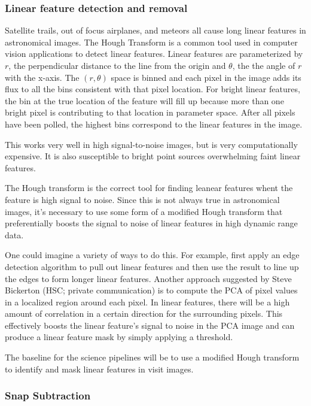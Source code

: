 \subsubsection{Linear feature detection and removal}
\label{sec:acLinearFeatureDetection}


Satellite trails, out of focus airplanes, and meteors all cause long linear features in astronomical images.  The Hough Transform \citep{c1962method} is a common tool used in computer vision applications to detect linear features.  Linear features are parameterized by $r$, the perpendicular distance to the line from the origin and $\theta$, the the angle of $r$ with the x-axis.  The $(r, \theta)$ space is binned and each pixel in the image adds its flux to all the bins consistent with that pixel location.  For bright linear features, the bin at the true location of the feature will fill up because more than one bright pixel is contributing to that location in parameter space.  After all pixels have been polled, the highest bins correspond to the linear features in the image.

This works very well in high signal-to-noise images, but is very computationally expensive.  It is also susceptible to bright point sources overwhelming faint linear features.

The Hough transform is the correct tool for finding leanear features whent the feature is high signal to noise.  Since this is not always true in astronomical images, it's necessary to use some form of a modified Hough transform that preferentially boosts the signal to noise of linear features in high dynamic range data.

One could imagine a variety of ways to do this.  For example, \cite{2016acs..rept....1B} first apply an edge detection algorithm to pull out linear features and then use the result to line up the edges to form longer linear features.  Another approach suggested by Steve Bickerton (HSC; private communication) is to compute the PCA of pixel values in a localized region around each pixel.  In linear features, there will be a high amount of correlation in a certain direction for the surrounding pixels.  This effectively boosts the linear feature's signal to noise in the PCA image and can produce a linear feature mask by simply applying a threshold.

The baseline for the science pipelines will be to use a modified Hough transform to identify and mask linear features in visit images.

\subsubsection{Snap Subtraction}
\label{sec:acSnapSubtraction}
